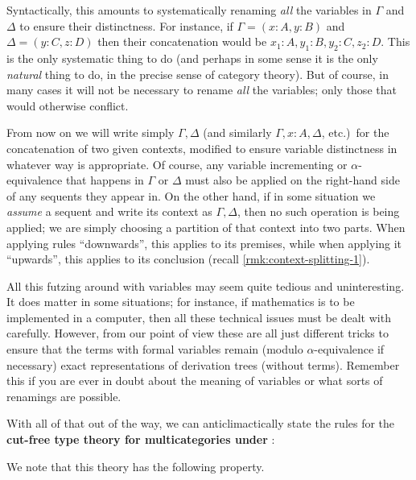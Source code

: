 \documentclass{book}
\let\types\vdash
\begin{document}
Syntactically, this amounts to systematically renaming \emph{all} the variables in $\Gamma$ and $\Delta$ to ensure their distinctness.
For instance, if $\Gamma=(x:A,y:B)$ and $\Delta=(y:C,z:D)$ then their concatenation would be $x_1:A,y_1:B,y_2:C,z_2:D$.
This is the only systematic thing to do (and perhaps in some sense it is the only \emph{natural} thing to do, in the precise sense of category theory).
But of course, in many cases it will not be necessary to rename \emph{all} the variables; only those that would otherwise conflict.

From now on we will write simply $\Gamma,\Delta$ (and similarly $\Gamma, x:A, \Delta$, etc.)\ for the concatenation of two given contexts, modified to ensure variable distinctness in whatever way is appropriate.
Of course, any variable incrementing or $\alpha$-equivalence that happens in $\Gamma$ or $\Delta$ must also be applied on the right-hand side of any sequents they appear in.
On the other hand, if in some situation we \emph{assume} a sequent and write its context as $\Gamma,\Delta$, then no such operation is being applied; we are simply choosing a partition of that context into two parts.
When applying rules ``downwards'', this applies to its premises, while when applying it ``upwards'', this applies to its conclusion (recall \cref{rmk:context-splitting-1}).

All this futzing around with variables may seem quite tedious and uninteresting.
It does matter in some situations; for instance, if mathematics is to be implemented in a computer, then all these technical issues must be dealt with carefully.
However, from our point of view these are all just different tricks to ensure that the terms with formal variables remain (modulo $\alpha$-equivalence if necessary) exact representations of derivation trees (without terms).
Remember this if you are ever in doubt about the meaning of variables or what sorts of renamings are possible.

With all of that out of the way, we can anticlimactically state the rules for the \textbf{cut-free type theory for multicategories under \cG}:
We note that this theory has the following property.
\end{document}
